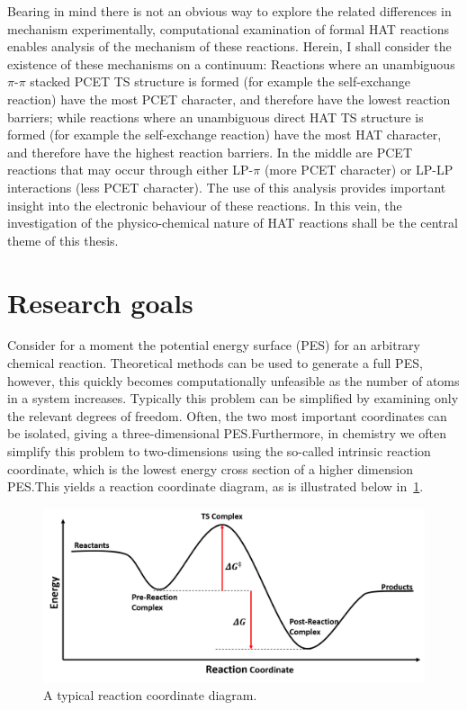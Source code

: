 \begin{doublespace}
Bearing in mind there is not an obvious way to explore the related differences
in mechanism experimentally, computational examination of formal HAT reactions
enables analysis of the mechanism of these reactions. Herein, I shall consider
the existence of these mechanisms on a continuum: Reactions where an unambiguous
$\pi$-$\pi$ stacked PCET TS structure is formed (for example the  self-exchange reaction) have the most PCET character, and therefore have
the lowest reaction barriers; while reactions where an unambiguous direct HAT TS
structure is formed (for example the  self-exchange reaction)
have the most HAT character, and therefore have the highest reaction barriers.
In the middle are PCET reactions that may occur through either LP-$\pi$ (more
PCET character) or LP-LP interactions (less PCET character). The use of this
analysis provides important insight into the electronic behaviour of these
reactions. In this vein, the investigation of the physico-chemical nature of HAT
reactions shall be the central theme of this thesis.

\section{Research goals}

Consider for a moment the potential energy surface (PES) for an arbitrary
chemical reaction. Theoretical methods can be used to generate a full PES,
however, this quickly becomes computationally unfeasible as the number of atoms
in a system increases. Typically this problem can be simplified by examining
only the relevant degrees of freedom. Often, the two most important coordinates
can be isolated, giving a three-dimensional PES.\@ Furthermore, in chemistry we
often simplify this problem to two-dimensions using the so-called intrinsic
reaction coordinate, which is the lowest energy cross section of a higher
dimension PES.\@ This yields a reaction coordinate diagram, as is illustrated
below in~\ref{fig:pes}.

\begin{figure}[htb]
  \centering
  \includegraphics[width=\textwidth]{figures/pes}
  \caption[A typical reaction coordinate diagram.]{A typical reaction
  coordinate diagram.}
\label{fig:pes}
\end{figure}


\end{doublespace}
